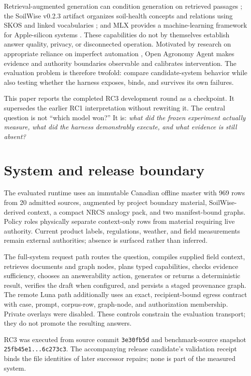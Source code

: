 \documentclass[9pt,twocolumn]{article}
\newcommand{\system}{Open Agronomy Agent}
\begin{document}
Retrieval-augmented generation can condition generation on retrieved passages \citep{lewis2020rag}; the SoilWise v0.2.3 artifact organizes soil-health concepts and relations using SKOS and linked vocabularies \citep{soilwisekg2025}; and MLX provides a machine-learning framework for Apple-silicon systems \citep{mlxframework}. These capabilities do not by themselves establish answer quality, privacy, or disconnected operation. Motivated by research on appropriate reliance on imperfect automation \citep{lee2004trust}, \system{} makes evidence and authority boundaries observable and calibrates intervention. The evaluation problem is therefore twofold: compare candidate-system behavior while also testing whether the harness exposes, binds, and survives its own failures.

This paper reports the completed RC3 development round as a checkpoint. It supersedes the earlier RC1 interpretation without rewriting it. The central question is not ``which model won?'' It is: \emph{what did the frozen experiment actually measure, what did the harness demonstrably execute, and what evidence is still absent?}

\section{System and release boundary}

The evaluated runtime uses an immutable Canadian offline master with 969 rows from 20 admitted sources, augmented by project boundary material, SoilWise-derived context, a compact NRCS analogy pack, and two manifest-bound graphs. Policy roles physically separate context-only rows from material requiring live authority. Current product labels, regulations, weather, and field measurements remain external authorities; absence is surfaced rather than inferred.

The full-system request path routes the question, compiles supplied field context, retrieves documents and graph nodes, plans typed capabilities, checks evidence sufficiency, chooses an answerability action, generates or returns a deterministic result, verifies the draft when configured, and persists a staged provenance graph. The remote Luna path additionally uses an exact, recipient-bound egress contract with case, prompt, corpus-row, graph-node, and authorization membership. Private overlays were disabled. These controls constrain the evaluation transport; they do not promote the resulting answers.

RC3 was executed from source commit \texttt{3e30fb5d} and benchmark-source snapshot \texttt{25fb45e1...6c273c3}. The accompanying release candidate's validation receipt binds the file identities of later successor repairs; none is part of the measured system.
\end{document}
